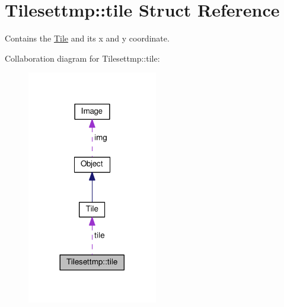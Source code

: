 \hypertarget{structTilesettmp_1_1tile}{}\section{Tilesettmp\+:\+:tile Struct Reference}
\label{structTilesettmp_1_1tile}


Contains the \hyperlink{classTile}{Tile} and its x and y coordinate.  




Collaboration diagram for Tilesettmp\+:\+:tile\+:\nopagebreak
\begin{figure}[H]
\begin{center}
\leavevmode
\includegraphics[width=161pt]{structTilesettmp_1_1tile__coll__graph}
\end{center}
\end{figure}
